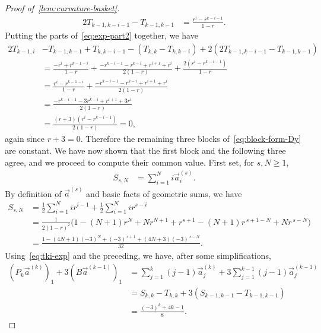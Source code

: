 \documentclass[11pt,a4paper]{article}
\begin{document}
\begin{proof}[Proof of~\cref{lem:curvature-basket}]
\begin{align}
                2T_{k-1,k-i-1} -T_{k-1, k-1} &= \frac{r^{i} - r^{k-i-1}}{1-r}.
            \end{align}
        Putting the parts of~\cref{eq:exp-part2} together, we have
            \begin{align*}
                2 T_{k-1, i} &- T_{k-1, k-1} + T_{k, k-i-1} - (T_{k, k} - T_{k, k-i}) + 2(2T_{k-1,k-i-1} -T_{k-1, k-1}) \\
                &= \frac{- r^{i} + r^{k-1-i}}{1-r} + \frac{-r^{k-i-1} - r^{k-i} + r^{i+1} + r^{i}}{ 2(1-r)} + \frac{2(r^{i} - r^{k-i-1})}{1-r}\\
                &= \frac{r^{i} - r^{k-1-i} }{1-r} + \frac{-r^{k-i-1} - r^{k-i} + r^{i+1} + r^{i}}{ 2(1-r)} \\
                &= \frac{-r^{k-i-1} - 3r^{k-i} + r^{i+1} + 3r^{i}}{2(1-r)}\\
                &= \frac{(r+3)(r^{i} - r^{k-i-1})}{2(1-r)} = 0,
            \end{align*}
        again since $r+3=0$. Therefore the remaining three blocks of~\cref{eq:block-form-Dy} are constant. We have now shown that the first block and the following three agree, and we proceed to compute their common value. First set, for $s, N\ge 1$,
            \begin{align*}
                S_{s, N} &= \sum_{i=1}^{N} i \vec{a}^{(s)}_i.
            \end{align*}
        By definition of $\vec{a}^{(s)}$ and basic facts of geometric sums, we have
            \begin{align*}
                S_{s, N} &= \frac{1}{2} \sum_{i=1}^{N} i r^{i-1} + \frac{1}{2} \sum_{i=1}^{N} i r^{s - i}\\
                &=\frac{1}{2(1-r)^2}\Big(1-(N+1)r^{N}+N r^{N+1}+ r^{s+1}-(N+1)r^{\,s+1-N}+N r^{\,s-N}\Big)\\
                &=\frac{1-(4N+1)(-3)^N + (-3)^{\,s+1} + (4N+3)(-3)^{\,s-N}}{32}.
            \end{align*}
        Using~\cref{eq:tki-exp} and the preceding, we have, after some simplifications,
            \begin{align*}
                (P_{k}\vec{a}^{(k)})_{1} + 3({B}\vec{a}^{(k-1)})_{1} &= \sum_{j=1}^{k} (j-1) \vec{a}^{(k)}_{j} + 3\sum_{j=1}^{k-1} (j-1) \vec{a}^{(k-1)}_{j}\\
                &= S_{k, k} - T_{k, k} + 3(S_{k-1, k-1} - T_{k-1, k-1})\\
                &= \frac{(-3)^k + 4k -1}{8}.
            \end{align*}

\end{proof}
\end{document}
